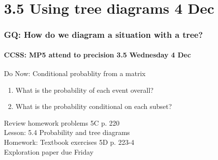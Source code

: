 \documentclass{beamer}
\begin{document}
\section{3.5 Using tree diagrams 4 Dec}
\frame
{
  \frametitle{GQ: How do we diagram a situation with a tree?}
  \framesubtitle{CCSS: MP5 attend to precision \hfill \alert{3.5 Wednesday 4 Dec}}

  \begin{block}{Do Now: Conditional probablity from a matrix}
  \begin{enumerate}
    \item What is the probability of each event overall?
    \item What is the probability conditional on each subset?
  \end{enumerate}
  \end{block}
  Review homework problems 5C p. 220 \\
  Lesson: 5.4 Probability and tree diagrams \\ \smallskip
  Homework: Textbook exercises 5D p. 223-4 \\
  Exploration paper \alert{due Friday}
}
\end{document}

